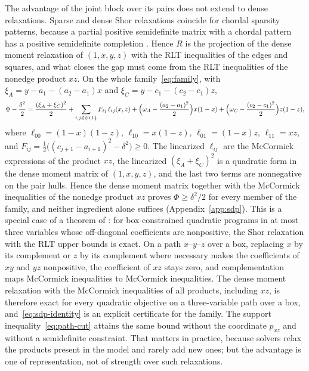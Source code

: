 The advantage of the joint block over its pairs does not extend to dense
relaxations. Sparse and dense Shor relaxations \citep{Shor1987} coincide
for chordal sparsity patterns, because a partial positive semidefinite
matrix with a chordal pattern has a positive semidefinite completion
\citep{GroneEtAl1984,WakiEtAl2006,Laurent2009}. Hence $R$ is the projection of
the dense moment relaxation of $(1,x,y,z)$ with the RLT inequalities
\citep{SheraliAdams1990,SheraliTuncbilek1992} of the edges and squares, and
what closes the gap must come from the RLT inequalities of the nonedge
product $xz$. On the whole family~\eqref{eq:family}, with
$\xi_A=y-a_1-(a_2-a_1)x$ and $\xi_C=y-c_1-(c_2-c_1)z$,
\begin{equation}\label{eq:sdp-identity}
\Phi-\frac{\delta^2}2=\frac{(\xi_A+\xi_C)^2}2+\sum_{i,j\in\{0,1\}}F_{ij}\,\ell_{ij}(x,z)
+\Bigl(\omega_A-\frac{(a_2-a_1)^2}2\Bigr)x(1-x)+\Bigl(\omega_C-\frac{(c_2-c_1)^2}2\Bigr)z(1-z),
\end{equation}
where $\ell_{00}=(1-x)(1-z)$, $\ell_{10}=x(1-z)$, $\ell_{01}=(1-x)z$,
$\ell_{11}=xz$, and $F_{ij}=\tfrac12\bigl((c_{j+1}-a_{i+1})^2-\delta^2\bigr)\ge0$.
The linearized $\ell_{ij}$ are the McCormick expressions of the product $xz$,
the linearized $(\xi_A+\xi_C)^2$ is a quadratic form in the dense moment matrix
of $(1,x,y,z)$, and the last two terms are nonnegative on the pair hulls.
Hence the dense moment matrix together with the McCormick inequalities of
the nonedge product $xz$ proves $\Phi\ge\delta^2/2$ for every member of the
family, and neither ingredient alone suffices (Appendix~\ref{app:sdp}). This
is a special case of a theorem of \citet[Theorem~1]{BurerNatarajanWillemsen2025}:
for box-constrained quadratic programs in at most three variables whose
off-diagonal coefficients are nonpositive, the Shor relaxation with the RLT
upper bounds is exact. On a path $x$--$y$--$z$ over a box, replacing $x$ by
its complement or $z$ by its complement where necessary makes the
coefficients of $xy$ and $yz$ nonpositive, the coefficient of $xz$ stays zero,
and complementation maps McCormick inequalities to McCormick inequalities.
The dense moment relaxation with the McCormick inequalities of all products,
including $xz$, is therefore exact for every quadratic objective on a
three-variable path over a box, and~\eqref{eq:sdp-identity} is an explicit
certificate for the family. The support inequality~\eqref{eq:path-cut}
attains the same bound without the coordinate $p_{xz}$ and without a
semidefinite constraint. That matters in practice, because solvers relax the
products present in the model and rarely add new ones; but the advantage is
one of representation, not of strength over such relaxations.

